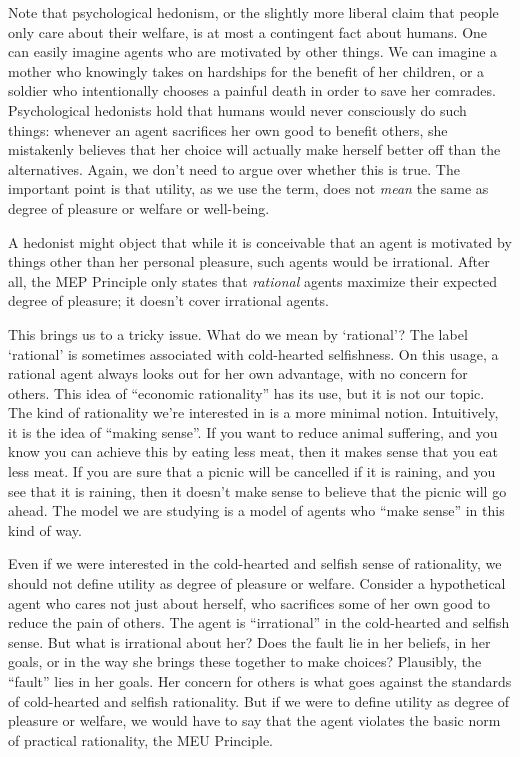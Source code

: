 Note that psychological hedonism, or the slightly more liberal claim that people
only care about their welfare, is at most a contingent fact about humans. One
can easily imagine agents who are motivated by other things. We can imagine a
mother who knowingly takes on hardships for the benefit of her children, or a
soldier who intentionally chooses a painful death in order to save her comrades.
Psychological hedonists hold that humans would never consciously do such things:
whenever an agent sacrifices her own good to benefit others, she mistakenly
believes that her choice will actually make herself better off than the
alternatives. Again, we don't need to argue over whether this is true. The
important point is that utility, as we use the term, does not \emph{mean} the
same as degree of pleasure or welfare or well-being.


A hedonist might object that while it is conceivable that an agent is motivated
by things other than her personal pleasure, such agents would be irrational.
After all, the MEP Principle only states that \emph{rational} agents maximize
their expected degree of pleasure; it doesn't cover irrational agents.

This brings us to a tricky issue. What do we mean by `rational'? The label
`rational' is sometimes associated with cold-hearted selfishness. On this usage,
a rational agent always looks out for her own advantage, with no concern for
others. This idea of ``economic rationality'' has its use, but it is not our
topic. The kind of rationality we're interested in is a more minimal notion.
Intuitively, it is the idea of ``making sense''. If you want to reduce animal
suffering, and you know you can achieve this by eating less meat, then it makes
sense that you eat less meat. If you are sure that a picnic will be cancelled if
it is raining, and you see that it is raining, then it doesn't make sense to
believe that the picnic will go ahead. The model we are studying is a model of
agents who ``make sense'' in this kind of way.

Even if we were interested in the cold-hearted and selfish sense of rationality,
we should not define utility as degree of pleasure or welfare. Consider a
hypothetical agent who cares not just about herself, who sacrifices some of her
own good to reduce the pain of others. The agent is ``irrational'' in the
cold-hearted and selfish sense. But what is irrational about her? Does the fault
lie in her beliefs, in her goals, or in the way she brings these together to
make choices? Plausibly, the ``fault'' lies in her goals. Her concern for others
is what goes against the standards of cold-hearted and selfish rationality. But
if we were to define utility as degree of pleasure or welfare, we would have to
say that the agent violates the basic norm of practical rationality, the MEU
Principle.

